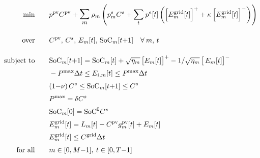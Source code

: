 \begin{subappendices}
\renewcommand{\arraystretch}{1}
\begin{subequations} \label{eq:example-problem-formulation}
    \begin{align}
        \addtocounter{equation}{-1}
        \text{min} & \qquad p^{\textrm{pv}} C^{\textrm{pv}} + \mathlarger{\mathlarger{\sum}}_m \: \rho_m \left( p^s_m C^s + \mathlarger{\sum}_t \: p^e[t] \left( \left[E^{\text{grid}}_m[t]\right]^+ + \kappa \left[E^{\text{grid}}_m[t]\right]^- \right) \right)
        \label{eq:example-lp} \\[\eqnskip]%
        \text{over} & \qquad C^{\textrm{pv}},\, C^s,\, E_m[t],\, \textrm{SoC}_m[t{+}1] \quad \forall \: m,\, t \tag*{} \\[\eqnskip]%
        \text{subject to} & \qquad \textrm{SoC}_m[t{+}1] = \textrm{SoC}_m[t] + \sqrt{\eta_m} \left[E_m[t]\right]^{+} - 1/\sqrt{\eta_m} \left[\, E_m[t] \right]^{-} \label{eq:example-dynamics-constraint} \\[\smalleqnskip]
        & \qquad -P^{\textrm{max}} \Delta t \leq E_{i,m}[t] \leq P^{\textrm{max}} \Delta t \label{eq:example-power-constraint} \\[\smalleqnskip]
        & \qquad (1{-}\nu)\, C^s \leq \textrm{SoC}_m[t{+}1] \leq C^s \label{eq:example-energy-constraint} \\[\smalleqnskip]
        & \qquad P^{\textrm{max}} = \delta C^s \label{eq:example-power-capacity} \\[\smalleqnskip]
        & \qquad \textrm{SoC}_m[0] = \textrm{SoC}^0 C^s \label{eq:example-initial-conditions} \\[\smalleqnskip]
        & \qquad E^{\text{grid}}_m[t] = L_{m}[t] - C^{\textrm{pv}} g_m^{\textrm{pv}}[t] + E_m[t] \label{eq:example-grid-variable} \\[\smalleqnskip]
        & \qquad E^{\text{grid}}_m[t] \leq C^{\text{grid}} \Delta t \label{eq:example-grid-cap} \\[\smalleqnskip]
        \text{for all} & \qquad m \in [0,M{-}1], \: t \in [0,T{-}1] \tag*{}
        \end{align}
\end{subequations}


\end{subappendices}
